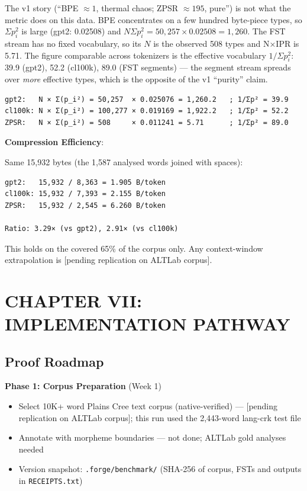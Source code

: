 \documentclass[11pt,oneside]{article}
\begin{document}
The v1 story (``BPE $\approx 1$, thermal chaos; ZPSR $\approx 195$, pure'') is not what the metric does on this data. BPE concentrates on a few hundred byte-piece types, so $\Sigma p_i^2$ is large (gpt2: 0.02508) and $N\Sigma p_i^2 = 50{,}257 \times 0.02508 = 1{,}260$. The FST stream has no fixed vocabulary, so its $N$ is the observed 508 types and N×IPR is 5.71. The figure comparable across tokenizers is the effective vocabulary $1/\Sigma p_i^2$: 39.9 (gpt2), 52.2 (cl100k), 89.0 (FST segments) --- the segment stream spreads over \emph{more} effective types, which is the opposite of the v1 ``purity'' claim.

\begin{lstlisting}
gpt2:   N × Σ(p_i²) = 50,257  × 0.025076 = 1,260.2   ; 1/Σp² = 39.9
cl100k: N × Σ(p_i²) = 100,277 × 0.019169 = 1,922.2   ; 1/Σp² = 52.2
ZPSR:   N × Σ(p_i²) = 508     × 0.011241 = 5.71      ; 1/Σp² = 89.0
\end{lstlisting}

\textbf{Compression Efficiency}:

Same 15,932 bytes (the 1,587 analysed words joined with spaces):

\begin{lstlisting}
gpt2:   15,932 / 8,363 = 1.905 B/token
cl100k: 15,932 / 7,393 = 2.155 B/token
ZPSR:   15,932 / 2,545 = 6.260 B/token

Ratio: 3.29× (vs gpt2), 2.91× (vs cl100k)
\end{lstlisting}

This holds on the covered 65\% of the corpus only. Any context-window extrapolation is [pending replication on ALTLab corpus].

\section{CHAPTER VII: IMPLEMENTATION PATHWAY}

\subsection{Proof Roadmap}

\textbf{Phase 1: Corpus Preparation} (Week 1)
\begin{itemize}
  \item Select 10K+ word Plains Cree text corpus (native-verified) --- [pending replication on ALTLab corpus]; this run used the 2,443-word lang-crk test file
  \item Annotate with morpheme boundaries --- not done; ALTLab gold analyses needed
  \item Version snapshot: \texttt{.forge/benchmark/} (SHA-256 of corpus, FSTs and outputs in \texttt{RECEIPTS.txt})
\end{itemize}
\end{document}

